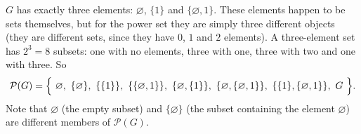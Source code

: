$G$ has exactly three elements: $\varnothing$, $\{1\}$ and $\{\varnothing,1\}$. These elements happen to be sets themselves, but for the power set they are simply three different objects (they are different sets, since they have $0$, $1$ and $2$ elements). A three-element set has $2^3=8$ subsets: one with no elements, three with one, three with two and one with three. So
\[
\mathcal P(G)=\Bigl\{\ \varnothing,\ \{\varnothing\},\ \{\{1\}\},\ \{\{\varnothing,1\}\},\ \{\varnothing,\{1\}\},\ \{\varnothing,\{\varnothing,1\}\},\ \{\{1\},\{\varnothing,1\}\},\ G\ \Bigr\}.
\]
Note that $\varnothing$ (the empty subset) and $\{\varnothing\}$ (the subset containing the element $\varnothing$) are different members of $\mathcal P(G)$.
